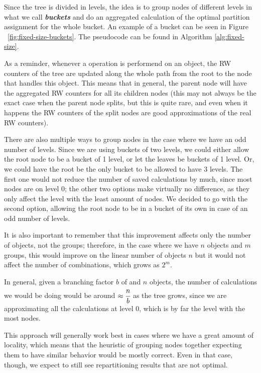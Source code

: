 Since the tree is divided in levels, the idea is to group nodes of different levels in what we call \textbf{\emph{buckets}} and do an aggregated calculation of the optimal partition assignment for the whole bucket. An example of a bucket can be seen in Figure ~\ref{fig:fixed-size-buckets}. The pseudocode can be found in Algorithm \ref{alg:fixed-size}.

As a reminder, whenever a operation is performend on an object, the RW counters of the tree are updated along the whole path from the root to the node that handles this object. This means that in general, the parent node will have the aggregated RW counters for all its children nodes (this may not always be the exact case when the parent node splits, but this is quite rare, and even when it happens the RW counters of the split nodes are good approximations of the real RW counters).

There are also multiple ways to group nodes in the case where we have an odd number of levels. Since we are using buckets of two levels, we could either allow the root node to be a bucket of 1 level, or let the leaves be buckets of 1 level. Or, we could have the root be the only bucket to be allowed to have 3 levels. The first one would not reduce the number of saved calculations by much, since most nodes are on level 0; the other two options make virtually no difference, as they only affect the level with the least amount of nodes. We decided to go with the second option, allowing the root node to be in a bucket of its own in case of an odd number of levels.

It is also important to remember that this improvement affects only the number of objects, not the groups; therefore, in the case where we have $n$ objects and $m$ groups, this would improve on the linear number of objects $n$ but it would not affect the number of combinations, which grows as $2^m$.

In general, given a branching factor $b$ of and $n$ objects, the number of calculations we would be doing would be around $\approx\cfrac{n}{b}$ as the tree grows, since we are approximating all the calculations at level 0, which is by far the level with the most nodes.

This approach will generally work best in cases where we have a great amount of locality, which means that the heuristic of grouping nodes together expecting them to have similar behavior would be mostly correct. Even in that case, though, we expect to still see repartitioning results that are not optimal.

